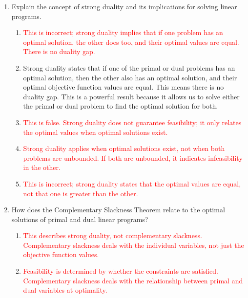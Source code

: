 \documentclass{article}%
\newcommand{\incorrect}[1]{\textcolor{red}{#1}}
\begin{document}
\begin{enumerate}
\begin{enumerate}
\item \incorrect{Complementary slackness is a separate but related concept. The Weak Duality Theorem provides a foundation for understanding complementary slackness but doesn't directly establish its conditions.}%
\item \incorrect{The Weak Duality Theorem does not prove that the duality gap is always zero.  That is the result of the Strong Duality Theorem.}%
\end{enumerate}%
\vspace{1em}%
\item Explain the concept of strong duality and its implications for solving linear programs.%
\begin{enumerate}%
\item \incorrect{This is incorrect; strong duality implies that if one problem has an optimal solution, the other does too, and their optimal values are equal.  There is no duality gap.}%
\item Strong duality states that if one of the primal or dual problems has an optimal solution, then the other also has an optimal solution, and their optimal objective function values are equal. This means there is no duality gap. This is a powerful result because it allows us to solve either the primal or dual problem to find the optimal solution for both.%
\item \incorrect{This is false. Strong duality does not guarantee feasibility; it only relates the optimal values when optimal solutions exist.}%
\item \incorrect{Strong duality applies when optimal solutions exist, not when both problems are unbounded.  If both are unbounded, it indicates infeasibility in the other.}%
\item \incorrect{This is incorrect; strong duality states that the optimal values are equal, not that one is greater than the other.}%
\end{enumerate}%
\vspace{1em}%
\item How does the Complementary Slackness Theorem relate to the optimal solutions of primal and dual linear programs?%
\begin{enumerate}%
\item \incorrect{This describes strong duality, not complementary slackness. Complementary slackness deals with the individual variables, not just the objective function values.}%
\item \incorrect{Feasibility is determined by whether the constraints are satisfied. Complementary slackness deals with the relationship between primal and dual variables at optimality.}%

\end{enumerate}
\end{enumerate}
\end{document}
